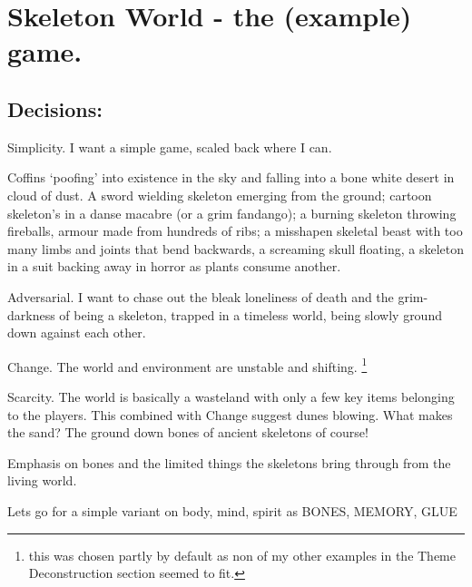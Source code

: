 
\section{Skeleton World - the (example) game.}



\subsection{Decisions:}

 Simplicity. I want a simple game, scaled back where I can. 

 Coffins `poofing' into existence in the sky and falling into a bone white desert in cloud of dust. A sword wielding skeleton emerging from the ground; cartoon skeleton's in a danse macabre (or a grim fandango); a burning skeleton throwing fireballs,  armour made from hundreds of ribs; a misshapen skeletal beast with too many limbs and joints that bend backwards, a screaming skull floating, a skeleton in a suit backing away in horror as plants consume another.

 Adversarial. I want to chase out the bleak loneliness of death and the grim-darkness of being a skeleton, trapped in a timeless world, being slowly ground down against each other.  

 Change. The world and environment are unstable and shifting. \footnote{this was chosen partly by default as non of my other examples in the Theme Deconstruction section seemed to fit.}

 Scarcity. The world is basically a wasteland with only a few key items belonging to the players. This combined with Change suggest dunes blowing. What makes the sand? The ground down bones of ancient skeletons of course!

 Emphasis on bones and the limited things the skeletons bring through from the living world.

 Lets go for a simple variant on body, mind, spirit as BONES, MEMORY, GLUE

